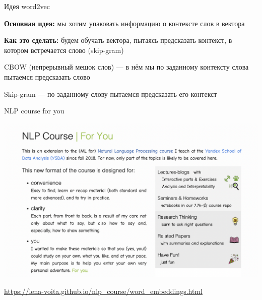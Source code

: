 \documentclass[notes,12pt, aspectratio=169]{beamer}
\newenvironment{wideitemize}{\itemize\addtolength{\itemsep}{10pt}}{\enditemize}
\begin{document}
\begin{frame}{Идея word2vec}
	\begin{wideitemize} 
		\item \textbf{Основная идея:} мы хотим упаковать информацию о контексте слов в вектора
		 
		\item \textbf{Как это сделать:} будем обучать вектора, пытаясь предсказать контекст, в котором встречается слово (skip-gram)   
		
		\pause
		
		\item  \alert{CBOW (непрерывный мешок слов)} —  в нём мы по заданному контексту слова пытаемся предсказать слово
		
		\item \alert{Skip-gram} — по заданному слову пытаемся предсказать его контекст 
	\end{wideitemize}
\end{frame} 


\begin{frame}{NLP course for you}
	\begin{center}
		\includegraphics[width=.75\linewidth]{nlp_for_you.png}
	\end{center}
\vfill
\footnotesize  {\color{blue} \url{https://lena-voita.github.io/nlp_course/word_embeddings.html}}
\end{frame} 
\end{document}
